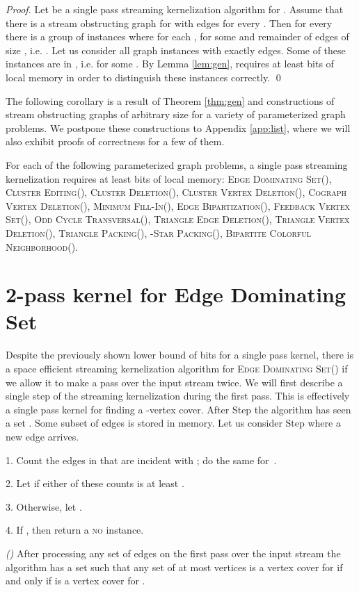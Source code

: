 \documentclass[draft,a4paper]{llncs}
\newcommand{\no}{\textsc{no}\xspace}
\newcommand{\EDSk}{\textsc{Edge Dominating Set()}\xspace}
\newcommand{\CEk}{\textsc{Cluster Editing()}\xspace}
\newcommand{\MFIk}{\textsc{Minimum Fill-In()}\xspace}
\newcommand{\FBVSk}{\textsc{Feedback Vertex Set()}\xspace}
\newcommand{\OCTk}{\textsc{Odd Cycle Transversal()}\xspace}
\newcommand{\CVDk}{\textsc{Cluster Vertex Deletion()}\xspace}
\newcommand{\CEDk}{\textsc{Cluster Deletion()}\xspace}
\newcommand{\BERk}{\textsc{Edge Bipartization()}\xspace}
\newcommand{\BCNk}{\textsc{Bipartite Colorful Neighborhood()}\xspace}
\newcommand{\CoVDk}{\textsc{Cograph Vertex Deletion()}\xspace}
\newcommand{\TEDk}{\textsc{Triangle Edge Deletion()}\xspace}
\newcommand{\TVDk}{\textsc{Triangle Vertex Deletion()}\xspace}
\newcommand{\TPk}{\textsc{Triangle Packing()}\xspace}
\newcommand{\sSPk}{-\textsc{Star Packing()}\xspace}
\begin{document}
\begin{proof}
 Let  be a single pass streaming kernelization algorithm for . Assume that there is a stream obstructing graph  for  with  edges for every . Then for every  there is a group of instances  where for each ,  for some  and remainder of edges  of size , i.e. . Let us consider all graph instances  with exactly  edges. Some of these
 instances are in , i.e.  for some . By Lemma \ref{lem:gen},  requires at least  bits of local memory in order to distinguish these instances correctly. \qed \end{proof}
 
 The following corollary is a result of Theorem \ref{thm:gen} and constructions of stream obstructing graphs of arbitrary size for a variety of parameterized graph problems. We postpone these constructions to Appendix \ref{app:list}, where we will also exhibit proofs of correctness for a few of them.

\begin{corollary}
 For each of the following parameterized graph problems, a single pass streaming kernelization requires at least  bits of local memory:
 \EDSk, \CEk, \CEDk, \CVDk, \CoVDk, \MFIk, \BERk, \FBVSk, \OCTk, \TEDk, \TVDk, \TPk, \sSPk, \BCNk.
\end{corollary}



\section{2-pass kernel for Edge Dominating Set} \label{sec:2pass}
Despite the previously shown lower bound of  bits for a single pass kernel, there is a space efficient streaming kernelization algorithm for \textsc{Edge Dominating Set}() if we allow it to make a pass over the input stream twice. We will first describe a single step of the streaming kernelization during the first pass. This is effectively a single pass kernel for finding a -vertex cover. After Step  the algorithm has seen a set . Some subset  of edges is stored in memory. Let us consider Step  where a new edge  arrives.

\smallskip

 1. Count the edges in  that are incident with ; do the same for~.
 
 2. Let  if either of these counts is at least .
 
 3. Otherwise, let .
 
 4. If , then return a \no instance.

\begin{lemma}\label{lem:vc} \emph{()}
 After processing any set  of edges on the first pass over the input stream the algorithm has a set  such
 that any set  of at most  vertices is a vertex cover for  if and only if  is a vertex cover for .
\end{lemma}
\end{document}
